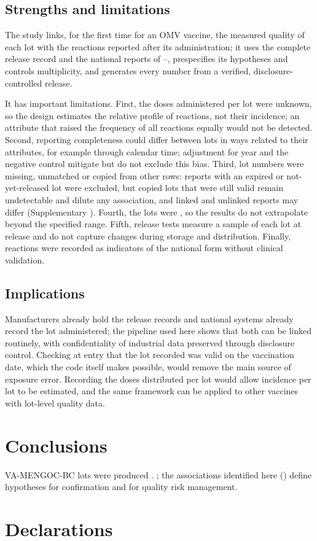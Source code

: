 \documentclass[11pt]{article}
\begin{document}
\subsection{Strengths and limitations}\label{sec:d-limitations}
The study links, for the first time for an OMV vaccine, the measured quality of each lot with the
reactions reported after its administration; it uses the complete release record and the national
reports of \VStudyFirstYear--\VStudyLastYear, prespecifies its hypotheses and controls multiplicity, and generates every number
from a verified, disclosure-controlled release.

It has important limitations. First, the doses administered per lot were unknown, so the design
estimates the relative profile of reactions, not their incidence; an attribute that raised the
frequency of all reactions equally would not be detected. Second, reporting completeness could
differ between lots in ways related to their attributes, for example through calendar time;
adjustment for year and the negative control mitigate but do not exclude this bias. Third, lot
numbers were missing, unmatched or copied from other rows: reports with an expired or not-yet-released
lot were excluded, but copied lots that were still valid remain undetectable and dilute any
association, and linked and unlinked reports may differ (Supplementary ). Fourth, the lots were \PTWithinSpecPhrase, so the
results do not extrapolate beyond the specified range. Fifth, release tests
measure a sample of each lot at release and do not capture changes during storage and distribution.
Finally, reactions were recorded as indicators of the national form without clinical validation.

\subsection{Implications}\label{sec:d-implications}
Manufacturers already hold the release records and national systems already record the lot
administered; the pipeline used here shows that both can be linked routinely, with confidentiality
of industrial data preserved through disclosure control. Checking at entry that the lot recorded was
valid on the vaccination date, which the code itself makes possible, would remove the main source
of exposure error. Recording the doses distributed per lot
would allow incidence per lot to be estimated, and the same framework can be applied to other
vaccines with lot-level quality data.

\section{Conclusions}\label{sec:conclusions}
VA-MENGOC-BC lots were produced \PTWithinSpecPhrase. \PTConclusionSentence; the
associations identified here (\PTSignificantList) define hypotheses for confirmation and for
quality risk management.

\section*{Declarations}




\end{document}
